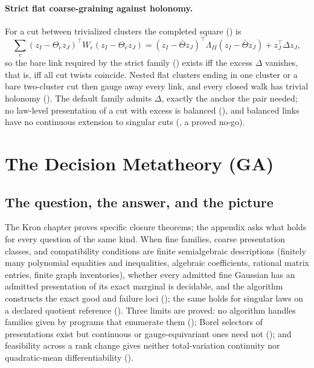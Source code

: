 \paragraph{Strict flat coarse-graining against holonomy.} For a cut between trivialized clusters the completed square
() is
\[
\sum_e(z_I-\Theta_ez_J)^\top W_e(z_I-\Theta_ez_J)
=(z_I-\bar\Theta z_J)^\top\Lambda_{II}(z_I-\bar\Theta z_J)+z_J^\top\Delta z_J,
\]
so the bare link required by the strict family () exists iff the excess \(\Delta\)
vanishes, that is, iff all cut twists coincide. Nested flat clusters ending in one cluster or a bare two-cluster cut
then gauge away every link, and every closed walk has trivial holonomy (). The default
family admits \(\Delta\), exactly the anchor the pair needed; no law-level presentation of a cut with excess is balanced
(), and balanced links have no continuous extension to singular cuts
(, a proved no-go).

\section{The Decision Metatheory (GA)}
\label{comp:sg2-decision}

\subsection{The question, the answer, and the picture}

The Kron chapter proves specific closure theorems; the appendix asks what holds for every question of the same kind.
When fine families, coarse presentation classes, and compatibility conditions are finite semialgebraic descriptions
(finitely many polynomial equalities and inequalities, algebraic coefficients, rational matrix entries, finite graph
inventories), whether every admitted fine Gaussian has an admitted presentation of its exact marginal is decidable,
and the algorithm constructs the exact good and failure loci (); the same
holds for singular laws on a declared quotient reference (). Three limits are
proved: no algorithm handles families given by programs that enumerate them ();
Borel selectors of presentations exist but continuous or gauge-equivariant ones need not
(); and feasibility across a rank change gives neither total-variation continuity
nor quadratic-mean differentiability ().

